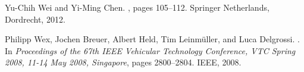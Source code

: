 \documentclass{beamer}
\begin{document}
\begin{frame}[allowframebreaks]
\begin{thebibliography}{10}
Yu-Chih Wei and Yi-Ming Chen.
, pages 105--112.
\newblock Springer Netherlands, Dordrecht, 2012.

Philipp Wex, Jochen Breuer, Albert Held, Tim Leinm{\"u}ller, and Luca
  Delgrossi.
.
\newblock In {\em {Proceedings of the 67th {IEEE} Vehicular Technology
  Conference, {VTC} Spring 2008, 11-14 May 2008, Singapore}}, pages 2800--2804.
  {IEEE}, 2008.

\end{thebibliography}

\end{frame}
\end{document}
